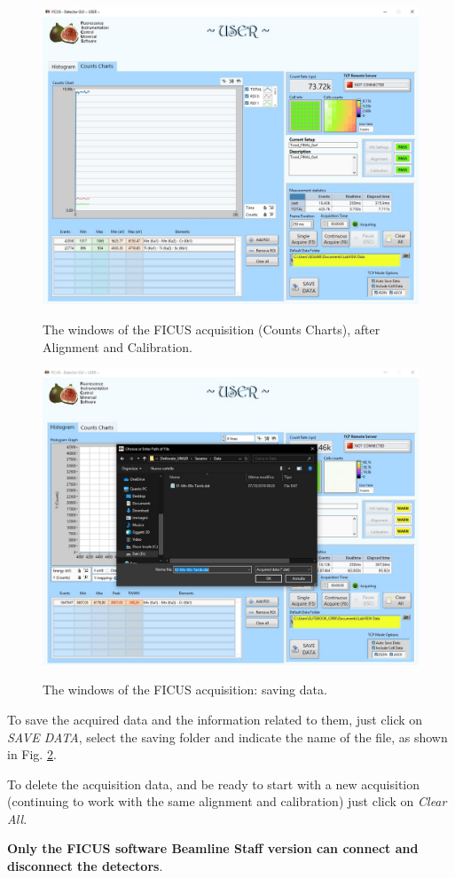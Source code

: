 \documentclass[a4paper,12pt,oneside,pdflatex,italian,final,twocolumn]{article}
\begin{document}
\begin{figure}[h]
\centering
{\includegraphics[width=.7\textwidth]{Capture36.jpg}} \quad
\caption{The windows of the FICUS acquisition (Counts Charts), after Alignment and Calibration.}\label{fig:fig62}
\end{figure}

\begin{figure}[h!]
\centering
{\includegraphics[width=.7\textwidth]{Cattura116.jpg}} \quad
\caption{The windows of the FICUS acquisition: saving data.}\label{fig:fig63}
\end{figure}

To save the acquired data and the information related to them, just click on \textit{SAVE DATA}, select the saving folder and indicate the name of the file, as shown in Fig. \ref{fig:fig63}. 

To delete the acquisition data, and be ready to start with a new acquisition (continuing to work with the same alignment and calibration) just click on \textit{Clear All}.

\textbf{Only the FICUS software Beamline Staff version can connect and disconnect the detectors}.
\end{document}
